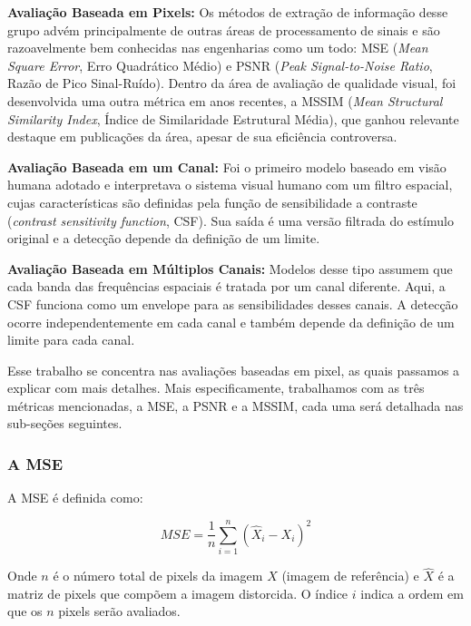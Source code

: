 \begin{description}
	\item{\textbf{Avaliação Baseada em Pixels:}}
		Os métodos de extração de informação desse grupo advém principalmente de outras áreas de processamento de sinais e são razoavelmente bem conhecidas nas engenharias como um todo: MSE (\emph{Mean Square Error}, Erro Quadrático Médio) e PSNR (\emph{Peak Signal-to-Noise Ratio}, Razão de Pico Sinal-Ruído). Dentro da área de avaliação de qualidade visual, foi desenvolvida uma outra métrica em anos recentes, a MSSIM (\emph{Mean Structural Similarity Index}, Índice de Similaridade Estrutural Média), que ganhou relevante destaque em publicações da área, apesar de sua eficiência controversa.
	\item{\textbf{Avaliação Baseada em um Canal:}}
		Foi o primeiro modelo baseado em visão humana adotado e interpretava o sistema visual humano com um filtro espacial, cujas características são definidas pela função de sensibilidade a contraste (\emph{contrast sensitivity function}, CSF). Sua saída é uma versão filtrada do estímulo original e a detecção depende da definição de um limite.
	\item{\textbf{Avaliação Baseada em Múltiplos Canais:}}
		Modelos desse tipo assumem que cada banda das frequências espaciais é tratada por um canal diferente. Aqui, a CSF funciona como um envelope para as sensibilidades desses canais. A detecção ocorre independentemente em cada canal e também depende da definição de um limite para cada canal.
\end{description}

Esse trabalho se concentra nas avaliações baseadas em pixel, as quais passamos a explicar com mais detalhes. Mais especificamente, trabalhamos com as três métricas mencionadas, a MSE, a PSNR e a MSSIM, cada uma será detalhada nas sub-seções seguintes.

\subsubsection{A MSE}
A MSE é definida como:

\begin{equation}
	MSE = \frac{1}{n}\sum^{n}_{i=1}(\hat{X}_i - X_i)^2
\end{equation}

Onde $n$ é o número total de pixels da imagem $X$ (imagem de referência) e  $\hat{X}$ é a matriz de pixels que compõem a imagem distorcida. O índice $i$ indica a ordem em que os $n$ pixels serão avaliados.


